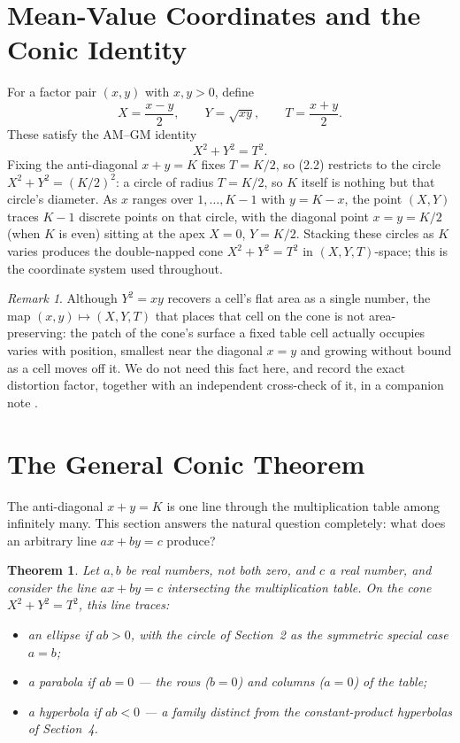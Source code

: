 \documentclass[11pt]{amsart}
\newtheorem{theorem}{Theorem}[section]
\theoremstyle{remark}
\newtheorem*{remark}{Remark}
\begin{document}
\section{Mean-Value Coordinates and the Conic Identity}

For a factor pair $(x,y)$ with $x,y>0$, define
\begin{equation}
X=\frac{x-y}2,\qquad Y=\sqrt{xy},\qquad T=\frac{x+y}2. \tag{2.1}
\end{equation}
These satisfy the AM--GM identity
\begin{equation}
X^2+Y^2=T^2. \tag{2.2}
\end{equation}
Fixing the anti-diagonal $x+y=K$ fixes $T=K/2$, so (2.2) restricts to the circle $X^2+Y^2=(K/2)^2$: a circle of radius $T=K/2$, so $K$ itself is nothing but that circle's diameter. As $x$ ranges over $1,\dots,K-1$ with $y=K-x$, the point $(X,Y)$ traces $K-1$ discrete points on that circle, with the diagonal point $x=y=K/2$ (when $K$ is even) sitting at the apex $X=0$, $Y=K/2$. Stacking these circles as $K$ varies produces the double-napped cone $X^2+Y^2=T^2$ in $(X,Y,T)$-space; this is the coordinate system used throughout.

\begin{remark}
Although $Y^2=xy$ recovers a cell's flat area as a single number, the map $(x,y)\mapsto(X,Y,T)$ that places that cell on the cone is not area-preserving: the patch of the cone's surface a fixed table cell actually occupies varies with position, smallest near the diagonal $x=y$ and growing without bound as a cell moves off it. We do not need this fact here, and record the exact distortion factor, together with an independent cross-check of it, in a companion note \cite{Ebert2026Area}.
\end{remark}

\section{The General Conic Theorem}

The anti-diagonal $x+y=K$ is one line through the multiplication table among infinitely many. This section answers the natural question completely: what does an arbitrary line $ax+by=c$ produce?

\begin{theorem}\label{thm:conic}
Let $a,b$ be real numbers, not both zero, and $c$ a real number, and consider the line $ax+by=c$ intersecting the multiplication table. On the cone $X^2+Y^2=T^2$, this line traces:
\begin{itemize}
\item an ellipse if $ab>0$, with the circle of Section~2 as the symmetric special case $a=b$;
\item a parabola if $ab=0$ --- the rows ($b=0$) and columns ($a=0$) of the table;
\item a hyperbola if $ab<0$ --- a family distinct from the constant-product hyperbolas of Section~4.
\end{itemize}
\end{theorem}
\end{document}
